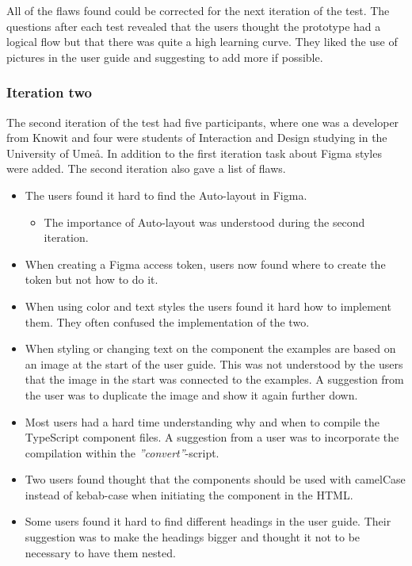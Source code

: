 All of the flaws found could be corrected for the next iteration of the test. The questions after each test revealed that the users thought the prototype had a logical flow but that there was quite a high learning curve. They liked the use of pictures in the user guide and suggesting to add more if possible.  

\subsubsection{Iteration two}%
\label{ssub:Iteration two}

The second iteration of the test had five participants, where one was a developer from Knowit and four were students of Interaction and Design studying in the University of Umeå. In addition to the first iteration task about Figma styles were added. The second iteration also gave a list of flaws.


\begin{itemize}
   \item The users found it hard to find the Auto-layout in Figma.
      \begin{itemize}
         \item The importance of Auto-layout was understood during the second iteration.
      \end{itemize}
   \item When creating a Figma access token, users now found where to create the token but not how to do it.
   \item When using color and text styles the users found it hard how to implement them. They often confused the implementation of the two. 
   \item When styling or changing text on the component the examples are based on an image at the start of the user guide. This was not understood by the users that the image in the start was connected to the examples. A suggestion from the user was to duplicate the image and show it again further down.
   \item Most users had a hard time understanding why and when to compile the TypeScript component files. A suggestion from a user was to incorporate the compilation within the \textit{''convert''}-script.
   \item Two users found thought that the components should be used with camelCase instead of kebab-case when initiating the component in the HTML.
   \item Some users found it hard to find different headings in the user guide. Their suggestion was to make the headings bigger and thought it not to be necessary to have them nested.
\end{itemize}


